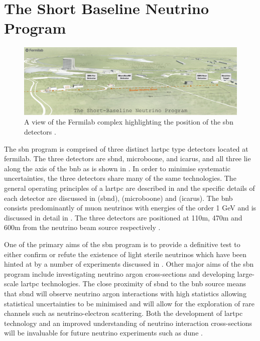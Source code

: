 \chapter{The Short Baseline Neutrino Program}
\label{chap:SBN Program}


\begin{figure}
    \centering
    \includegraphics[width = \hugefigwidth]{figures-chap3/SBN_program.jpg}
    \caption[SBN map.]{A view of the Fermilab complex highlighting the position of the \gls{sbn} detectors \cite{SBN_paper}.}
    \label{fig:sbn_complex}
\end{figure}

The \gls{sbn} program is comprised of three distinct \gls{lartpc} type detectors located at \gls{fermilab}. The three detectors are \gls{sbnd}, \gls{microboone}, and \gls{icarus}, and all three lie along the axis of the \gls{bnb} as is shown in . In order to minimise systematic uncertainties, the three detectors share many of the same technologies. The general operating principles of a \gls{lartpc} are described in  and the specific details of each detector are discussed in  (\gls{sbnd}),  (\gls{microboone}) and  (\gls{icarus}). The \gls{bnb} consists predominantly of muon neutrinos with energies of the order 1 GeV and is discussed in detail in . The three detectors are positioned at 110m, 470m and 600m from the neutrino beam source respectively \cite{SBN_paper}. 

One of the primary aims of the \gls{sbn} program is to provide a definitive test to either confirm or refute the existence of light sterile neutrinos which have been hinted at by a number of experiments discussed in . Other major aims of the \gls{sbn} program include investigating neutrino argon cross-sections and developing large-scale \gls{lartpc} technologies. The close proximity of \gls{sbnd} to the \gls{bnb} source means that \gls{sbnd} will observe neutrino argon interactions with high statistics allowing statistical uncertainties to be minimised and will allow for the exploration of rare channels such as neutrino-electron scattering. Both the development of \gls{lartpc} technology and an improved understanding of neutrino interaction cross-sections will be invaluable for future neutrino experiments such as \gls{dune} \cite{SBN_paper}.


